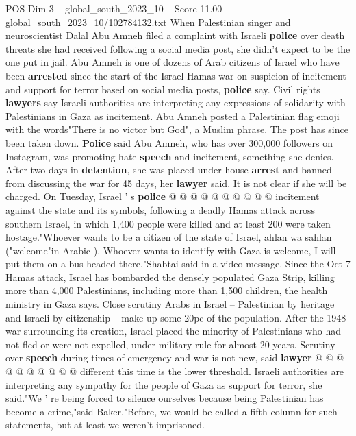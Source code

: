 \begin{textsample}{POS Dim 3 – global\_south\_2023\_10 – Score 11.00 – global\_south\_2023\_10/102784132.txt}  \label{ex:f3_pos_429}
When Palestinian singer and neuroscientist Dalal Abu Amneh filed a complaint with Israeli \textbf{police} over death threats she had received following a social media post, she didn't expect to be the one put in jail.
Abu Amneh is one of dozens of Arab citizens of Israel who have been \textbf{arrested} since the start of the Israel-Hamas war on suspicion of incitement and support for terror based on social media posts, \textbf{police} say.
Civil rights \textbf{lawyers} say Israeli authorities are interpreting any expressions of solidarity with Palestinians in Gaza as incitement.
Abu Amneh posted a Palestinian flag emoji with the words"There is no victor but God", a Muslim phrase.
The post has since been taken down. \textbf{Police} said Abu Amneh, who has over 300,000 followers on Instagram, was promoting hate \textbf{speech} and incitement, something she denies.
After two days in \textbf{detention}, she was placed under house \textbf{arrest} and banned from discussing the war for 45 days, her \textbf{lawyer} said.
It is not clear if she will be charged.
On Tuesday, Israel ' s \textbf{police} @ @ @ @ @ @ @ @ @ @ incitement against the state and its symbols, following a deadly Hamas attack across southern Israel, in which 1,400 people were killed and at least 200 were taken hostage."Whoever wants to be a citizen of the state of Israel, ahlan wa sahlan ("welcome"in Arabic ).
Whoever wants to identify with Gaza is welcome, I will put them on a bus headed there,"Shabtai said in a video message.
Since the Oct 7 Hamas attack, Israel has bombarded the densely populated Gaza Strip, killing more than 4,000 Palestinians, including more than 1,500 children, the health ministry in Gaza says.
Close scrutiny Arabs in Israel -- Palestinian by heritage and Israeli by citizenship -- make up some 20pc of the population.
After the 1948 war surrounding its creation, Israel placed the minority of Palestinians who had not fled or were not expelled, under military rule for almost 20 years.
Scrutiny over \textbf{speech} during times of emergency and war is not new, said \textbf{lawyer} @ @ @ @ @ @ @ @ @ @ different this time is the lower threshold.
Israeli authorities are interpreting any sympathy for the people of Gaza as support for terror, she said."We ' re being forced to silence ourselves because being Palestinian has become a crime,"said Baker."Before, we would be called a fifth column for such statements, but at least we weren't imprisoned.

\end{textsample}
